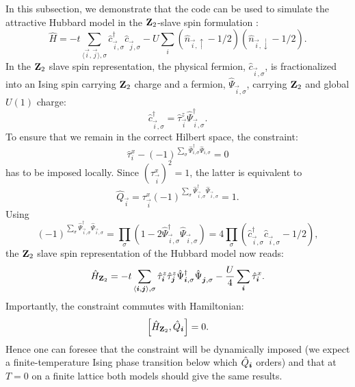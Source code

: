 In this subsection, we  demonstrate that the code can be used to  simulate the attractive Hubbard model in the  $\mathbf{Z}_{2}$-slave spin formulation \cite{Ruegg10}:
\begin{equation}
        \hat{H} = -t \sum_{\langle \vec{i}, \vec{j} \rangle, \sigma }\hat{c}^{\dagger}_{\vec{i},\sigma} \hat{c}^{\phantom{\dagger}}_{\vec{j},\sigma}   -  U  \sum_i
        \left( \hat{n}_{\vec{i}, \uparrow} - 1/2\right)  \left( \hat{n}_{\vec{i}, \downarrow} - 1/2\right).
\end{equation}
In the $\mathbf{Z}_{2}$ slave spin  representation, the physical fermion, $\hat{c}_{\vec{i},\sigma} $,   is fractionalized into  an Ising spin carrying $\mathbf{Z}_{2}$ charge and a fermion, $\hat{\Psi}_{\vec{i},\sigma} $, carrying $\mathbf{Z}_{2}$ and  global $U(1)$ charge:
\begin{equation}
        \hat{c}^{\dagger}_{\vec{i},\sigma}  = \hat{\tau}^{z}_{\vec{i}} \hat{\Psi}^{\dagger}_{\vec{i},\sigma}.
\end{equation}
To ensure that we remain in the correct Hilbert space, the constraint:
\begin{equation}
        \hat{\tau}^{x}_{i}   - (-1)^{\sum_{\sigma}\hat{\Psi}^{\dagger}_{i,\sigma}  \hat{\Psi}^{\phantom{\dagger}}_{i,\sigma}  }  = 0
\end{equation}
has to be imposed locally. Since $\left(  \tau^{x}_{\vec{i}}\right)^2 = 1 $, the latter is   equivalent to
 \begin{equation}
        \hat{Q}_{\vec{i}} = \tau^{x}_{\vec{i}}  (-1)^{\sum_{\sigma}\hat{\Psi}^{\dagger}_{\vec{i},\sigma}  \hat{\Psi}^{\phantom{\dagger}}_{\vec{i},\sigma}  }   = 1.
 \end{equation}
 Using 
 \begin{equation}
 	(-1)^{\sum_{\sigma}\hat{\Psi}^{\dagger}_{\vec{i},\sigma}  \hat{\Psi}^{\phantom{\dagger}}_{\vec{i},\sigma}  }    = \prod_{\sigma} ( 1 - 2 \hat{\Psi}^{\dagger}_{\vec{i},\sigma}  \hat{\Psi}^{\phantom{\dagger}}_{\vec{i},\sigma} ) =  4\prod_{\sigma} ( \hat{c}^{\dagger}_{\vec{i},\sigma}  \hat{c}^{\phantom{\dagger}}_{\vec{i},\sigma}  - 1/2 ),
 \end{equation}
 the  $\mathbf{Z}_{2}$ slave spin representation of  the Hubbard model now reads:
 \begin{equation}
         \hat{H}_{\mathbf{Z}_{2}}= -t \sum_{\langle \boldsymbol{i}, \boldsymbol{j} \rangle, \sigma }  \hat{\tau}^{z}_{\boldsymbol{i}}  \hat{\tau}^{z}_{\boldsymbol{j}} \hat{\Psi}^{\dagger}_{\boldsymbol{i},\sigma} \hat{\Psi}^{\phantom{\dagger}}_{\boldsymbol{j},\sigma}   -  \frac{U}{4}  \sum_{\boldsymbol{i}}  \hat{\tau}^{x}_{\boldsymbol{i}}.
 \end{equation}
 Importantly, the constraint  commutes with Hamiltonian:
 \begin{equation}
        \left[ \hat{H}_{\mathbf{Z}_{2}}, \hat{Q}_{\boldsymbol{i}} \right] = 0.
 \end{equation}
Hence  one can foresee that the constraint will be dynamically imposed (we expect a finite-temperature Ising phase  transition below which $\hat{Q}_{\boldsymbol{i}}$ orders) and that at  $T=0$ on a finite lattice both models should give the same results.


